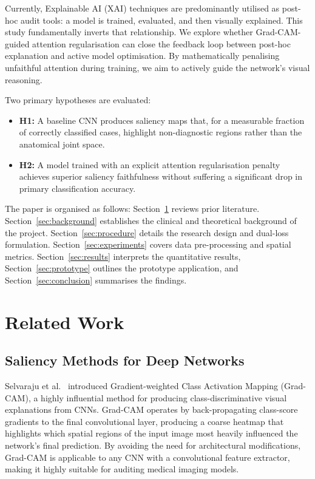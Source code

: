 \documentclass[conference]{IEEEtran}
\begin{document}
Currently, Explainable AI (XAI) techniques are predominantly utilised as post-hoc audit tools: a model is trained, evaluated, and then visually explained. This study fundamentally inverts that relationship. We explore whether Grad-CAM-guided attention regularisation can close the feedback loop between post-hoc explanation and active model optimisation. By mathematically penalising unfaithful attention during training, we aim to actively guide the network's visual reasoning.

Two primary hypotheses are evaluated:
\begin{itemize}
  \item \textbf{H1:} A baseline CNN produces saliency maps that, for a measurable fraction of correctly classified cases, highlight non-diagnostic regions rather than the anatomical joint space.
  \item \textbf{H2:} A model trained with an explicit attention regularisation penalty achieves superior saliency faithfulness without suffering a significant drop in primary classification accuracy.
\end{itemize}

The paper is organised as follows: Section~\ref{sec:related} reviews prior literature. Section~\ref{sec:background} establishes the clinical and theoretical background of the project. Section~\ref{sec:procedure} details the research design and dual-loss formulation. Section~\ref{sec:experiments} covers data pre-processing and spatial metrics. Section~\ref{sec:results} interprets the quantitative results, Section~\ref{sec:prototype} outlines the prototype application, and Section~\ref{sec:conclusion} summarises the findings.

\section{Related Work}
\label{sec:related}

\subsection{Saliency Methods for Deep Networks}
Selvaraju et al.\ \cite{selvaraju2017} introduced Gradient-weighted Class Activation Mapping (Grad-CAM), a highly influential method for producing class-discriminative visual explanations from CNNs. Grad-CAM operates by back-propagating class-score gradients to the final convolutional layer, producing a coarse heatmap that highlights which spatial regions of the input image most heavily influenced the network's final prediction. By avoiding the need for architectural modifications, Grad-CAM is applicable to any CNN with a convolutional feature extractor, making it highly suitable for auditing medical imaging models.
\end{document}
